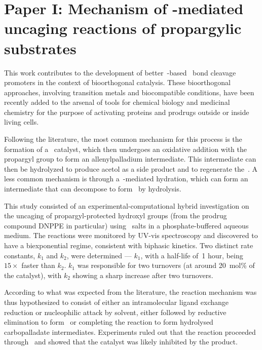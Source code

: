 \chapter[Paper I:\@
  Mechanism of palladium-mediated
  uncaging reactions
  of propargylic substrates]{Paper I:\@
  Mechanism of -mediated
  uncaging reactions %
  of propargylic substrates
 }%
\label{ch:paper1}

\begin{citacao}
\end{citacao}

This work contributes to the development of better~-based~ bond cleavage promoters in the context of bioorthogonal catalysis.
These bioorthogonal approaches,
involving transition metals and biocompatible conditions,
have been recently added to the arsenal of tools for chemical biology and medicinal chemistry for the purpose of activating proteins and prodrugs outside or inside living cells.

Following the literature,
the most common mechanism for this process is the formation of a~ catalyst,
which then undergoes an oxidative addition with the propargyl group to form an allenylpalladium intermediate.
This intermediate can then be hydrolyzed to produce acetol as a side product and to regenerate the~.
A less common mechanism is through a~-mediated hydration,
which can form an intermediate that can decompose to form~ by hydrolysis.

This study consisted of an experimental-computational hybrid investigation on the uncaging of propargyl-protected hydroxyl groups (from the prodrug compound DNPPE in particular) using~ salts in a phosphate-buffered aqueous medium.
The reactions were monitored by UV-vis spectroscopy and discovered to have a biexponential regime,
consistent with biphasic kinetics.
Two distinct rate constants,
$k_1$ and $k_2$,
were determined --- $k_1$,
with a half-life of~1 hour,
being $15 \times$ faster than $k_2$.
$k_1$ was responsible for two turnovers (at around 20~mol\% of the catalyst),
with $k_2$ showing a sharp increase after two turnovers.

According to what was expected from the literature,
the reaction mechanism was thus hypothesized to consist of either
an intramolecular ligand exchange reduction
or nucleophilic attack by solvent,
either followed by reductive elimination to form~
or completing the reaction to form hydrolysed carbopalladate intermediates.
Experiments ruled out that the reaction proceeded through~
and showed that the catalyst was likely inhibited by the product.


